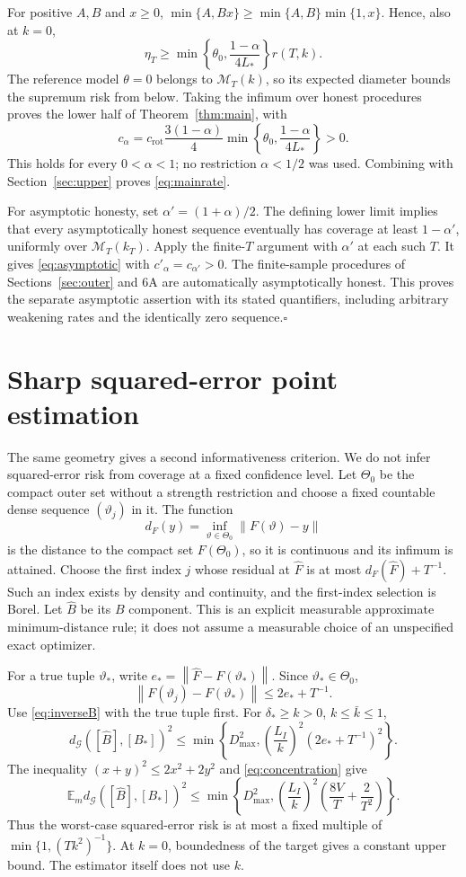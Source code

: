 \documentclass[11pt,a4paper]{article}
\numberwithin{equation}{section}
\newcommand{\E}{\mathbb E}
\newcommand{\cM}{\mathcal M}
\newcommand{\cG}{\mathcal G}
\newcommand{\norm}[1]{\left\lVert #1\right\rVert}
\begin{document}
For positive \(A,B\) and \(x\ge0\),
\(\min\{A,Bx\}\ge\min\{A,B\}\min\{1,x\}\). Hence, also at \(k=0\),
\[
 \eta_T\ge
 \min\left\{\theta_0,\frac{1-\alpha}{4L_*}\right\}r(T,k).
\]
The reference model \(\theta=0\) belongs to \(\cM_T(k)\), so its
expected diameter bounds the supremum risk from below.
Taking the infimum over honest procedures proves the lower half of
Theorem~\ref{thm:main}, with
\[
 c_\alpha=c_{\mathrm{rot}}\frac{3(1-\alpha)}4
       \min\left\{\theta_0,\frac{1-\alpha}{4L_*}\right\}>0.
\]
This holds for every \(0<\alpha<1\); no restriction
\(\alpha<1/2\) was used. Combining with Section~\ref{sec:upper}
proves \eqref{eq:mainrate}.

For asymptotic honesty, set \(\alpha'=(1+\alpha)/2\).
The defining lower limit implies that every asymptotically honest
sequence eventually has coverage at least \(1-\alpha'\), uniformly
over \(\cM_T(k_T)\). Apply the finite-\(T\) argument with \(\alpha'\)
at each such \(T\). It gives \eqref{eq:asymptotic} with
\(c'_\alpha=c_{\alpha'}>0\).
The finite-sample procedures of Sections~\ref{sec:outer} and 6A are
automatically asymptotically honest. This proves the separate asymptotic
assertion with its stated quantifiers, including arbitrary weakening
rates and the identically zero sequence.\hfill\(\square\)

\section{Sharp squared-error point estimation}\label{sec:estimation}
The same geometry gives a second informativeness criterion.
We do not infer squared-error risk from coverage at a fixed confidence
level. Let \(\Theta_0\) be the compact outer set without a strength
restriction and choose a fixed countable dense sequence
\((\vartheta_j)\) in it.
The function
\[
 d_F(y)=\inf_{\vartheta\in\Theta_0}\norm{F(\vartheta)-y}
\]
is the distance to the compact set \(F(\Theta_0)\), so it is continuous
and its infimum is attained.
Choose the first index \(j\) whose residual at \(\widehat F\) is at most
\(d_F(\widehat F)+T^{-1}\).
Such an index exists by density and continuity, and the first-index
selection is Borel.
Let \(\widehat B\) be its \(B\) component.
This is an explicit measurable approximate minimum-distance rule; it does
not assume a measurable choice of an unspecified exact optimizer.

For a true tuple \(\vartheta_*\), write
\(e_*=\norm{\widehat F-F(\vartheta_*)}\).
Since \(\vartheta_*\in\Theta_0\),
\[
 \norm{F(\vartheta_j)-F(\vartheta_*)}\le2e_*+T^{-1}.
\]
Use \eqref{eq:inverseB} with the true tuple first.
For \(\delta_*\ge k>0\), \(k\le\bar k\le1\),
\[
 d_{\cG}([\widehat B],[B_*])^2
 \le\min\left\{D_{\max}^2,
       \left(\frac{L_I}{k}\right)^2(2e_*+T^{-1})^2\right\}.
\]
The inequality \((x+y)^2\le2x^2+2y^2\) and
\eqref{eq:concentration} give
\[
 \E_m d_{\cG}([\widehat B],[B_*])^2
 \le\min\left\{D_{\max}^2,
       \left(\frac{L_I}{k}\right)^2
           \left(\frac{8V}{T}+\frac2{T^2}\right)\right\}.
\]
Thus the worst-case squared-error risk is at most a fixed multiple of
\(\min\{1,(Tk^2)^{-1}\}\).
At \(k=0\), boundedness of the target gives a constant upper bound.
The estimator itself does not use \(k\).
\end{document}
